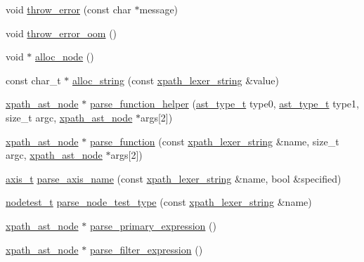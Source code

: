 \begin{DoxyCompactItemize}
\item 
void \hyperlink{structxpath__parser_a043353db574741cd4f460a042a0b22c6}{throw\-\_\-error} (const char $\ast$message)
\item 
void \hyperlink{structxpath__parser_aeb5c7d7a6f8c5705a769297f42960c3e}{throw\-\_\-error\-\_\-oom} ()
\item 
void $\ast$ \hyperlink{structxpath__parser_ae33adcc8eb125124967d95297daff351}{alloc\-\_\-node} ()
\item 
const char\-\_\-t $\ast$ \hyperlink{structxpath__parser_a109e4c472bb76911a2b49ee741d400af}{alloc\-\_\-string} (const \hyperlink{structxpath__lexer__string}{xpath\-\_\-lexer\-\_\-string} \&value)
\item 
\hyperlink{classxpath__ast__node}{xpath\-\_\-ast\-\_\-node} $\ast$ \hyperlink{structxpath__parser_a21a1a2579c610e0ebd76247b9d325bb1}{parse\-\_\-function\-\_\-helper} (\hyperlink{pugixml_8cpp_a11258a240266b84b6b0526930e5d330d}{ast\-\_\-type\-\_\-t} type0, \hyperlink{pugixml_8cpp_a11258a240266b84b6b0526930e5d330d}{ast\-\_\-type\-\_\-t} type1, size\-\_\-t argc, \hyperlink{classxpath__ast__node}{xpath\-\_\-ast\-\_\-node} $\ast$args\mbox{[}2\mbox{]})
\item 
\hyperlink{classxpath__ast__node}{xpath\-\_\-ast\-\_\-node} $\ast$ \hyperlink{structxpath__parser_a7acb32147ef3aac058f94257b57ff14f}{parse\-\_\-function} (const \hyperlink{structxpath__lexer__string}{xpath\-\_\-lexer\-\_\-string} \&name, size\-\_\-t argc, \hyperlink{classxpath__ast__node}{xpath\-\_\-ast\-\_\-node} $\ast$args\mbox{[}2\mbox{]})
\item 
\hyperlink{pugixml_8cpp_ae7747145441b0591a5c04f20f6f9189a}{axis\-\_\-t} \hyperlink{structxpath__parser_ad67ec26e0e286ca1bb5144a79e3a3583}{parse\-\_\-axis\-\_\-name} (const \hyperlink{structxpath__lexer__string}{xpath\-\_\-lexer\-\_\-string} \&name, bool \&specified)
\item 
\hyperlink{pugixml_8cpp_ab268b4264276130baeb17ab629015275}{nodetest\-\_\-t} \hyperlink{structxpath__parser_a7b4555d7bfdb90971333c46963d5d791}{parse\-\_\-node\-\_\-test\-\_\-type} (const \hyperlink{structxpath__lexer__string}{xpath\-\_\-lexer\-\_\-string} \&name)
\item 
\hyperlink{classxpath__ast__node}{xpath\-\_\-ast\-\_\-node} $\ast$ \hyperlink{structxpath__parser_a320728b83e426c4874066d633ffe65d9}{parse\-\_\-primary\-\_\-expression} ()
\item 
\hyperlink{classxpath__ast__node}{xpath\-\_\-ast\-\_\-node} $\ast$ \hyperlink{structxpath__parser_a0530aefc1445c4eac4614e895dd0a219}{parse\-\_\-filter\-\_\-expression} ()

\end{DoxyCompactItemize}
